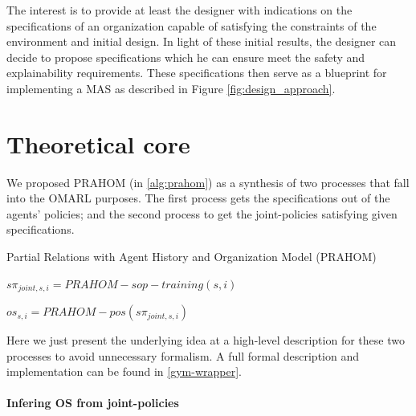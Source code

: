 \documentclass[runningheads]{llncs}
\begin{document}
The interest is to provide at least the designer with indications on the specifications of an organization capable of satisfying the constraints of the environment and initial design. In light of these initial results, the designer can decide to propose specifications which he can ensure meet the safety and explainability requirements. These specifications then serve as a blueprint for implementing a MAS as described in Figure \ref{fig:design_approach}.


\section{Theoretical core}

We proposed PRAHOM (in \autoref{alg:prahom}) as a synthesis of two processes that fall into the OMARL purposes. The first process gets the specifications out of the agents' policies; and the second process to get the joint-policies satisfying given specifications.


\begin{algorithm}[hbt!]
    \caption{Partial Relations with Agent History and Organization Model (PRAHOM)}\label{alg:prahom}



    $s\pi_{joint,s,i} = PRAHOM-sop-training(s,i)$

    $os_{s,i} = PRAHOM-pos(s\pi_{joint,s,i})$

\end{algorithm}

Here we just present the underlying idea at a high-level description for these two processes to avoid unnecessary formalism. A full formal description and implementation can be found in \autoref{gym-wrapper}.

\paragraph{\textbf{Infering OS from joint-policies}}
\end{document}
